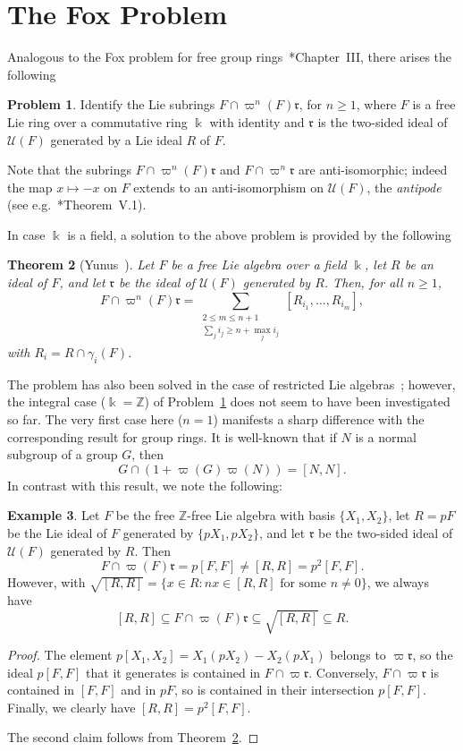 \documentclass[a4paper,reqno,notitlepage]{amsart}
\newtheorem{theorem}{Theorem}[section]
\theoremstyle{definition}
\newtheorem{problem}[theorem]{Problem}
\newtheorem{example}[theorem]{Example}
\newcommand{\Z}{\mathbb Z}
\newcommand\rr{{\mathfrak r}}
\newcommand\K{\Bbbk}
\newcommand\U{\mathscr U}
\begin{document}
\section{The Fox Problem}\label{ss:fox}
Analogous to the Fox problem for free group
rings~\cite{Gupta:87}*{Chapter~III}, there arises the following
\begin{problem}\label{fox}
  Identify the Lie subrings $F\cap\varpi^n(F)\rr$, for $n\geq
  1$, where $F$ is a free Lie ring over a commutative ring $\K$ with
  identity and $\rr$ is the two-sided ideal of $\U(F)$
  generated by a Lie ideal $R$ of $F$.
\end{problem}
Note that the subrings $F\cap\varpi^n(F)\rr$ and $F\cap\varpi^n\rr$
are anti-isomorphic; indeed the map $x\mapsto-x$ on $F$ extends to an
anti-isomorphism on $\U(F)$, the \emph{antipode} (see
e.g.~\cite{Jacobson:1962}*{Theorem~V.1}).

In case $\K$ is a field, a solution to the above problem is provided by
the following
\begin{theorem}[Yunus~\cite{Yunus:84}]\label{thm:yunus}
  Let $F$ be a free Lie algebra over a field $\K$, let $R$ be an ideal
  of $F$, and let $\rr$ be the ideal of $\U(F)$ generated by
  $R$. Then, for all $n\ge1$,
  \[F\cap \varpi^n(F)\rr=\sum_{\substack{2\leq m\leq n+1\\
      \sum_j i_j\geq n+\max_j i_j}} [R_{i_1},\ldots,R_{i_m}],
  \]
  with $R_i=R\cap \gamma_i(F)$.
\end{theorem}

The problem has also been solved in the case of restricted Lie
algebras~\cites{Usefi:2008,Usefi:2008a}; however, the integral case
($\K=\Z$) of Problem~\ref{fox} does not seem to have been investigated
so far. The very first case here ($n=1$) manifests a sharp difference
with the corresponding result for group rings. It is well-known that
if $N$ is a normal subgroup of a group $G$, then
\[G\cap (1+\varpi(G)\varpi(N))=[N,N].
\]
In contrast with this result, we note the following:

\begin{example}\label{example:fox}
  Let $F$ be the free $\Z$-free Lie algebra with basis $\{X_1,X_2\}$,
  let $R=pF$ be the Lie ideal of $F$ generated by $\{pX_1,pX_2\}$, and
  let $\rr$ be the two-sided ideal of $\U(F)$ generated by $R$. Then
  \[F\cap\varpi(F)\rr=p[F,F]\neq [R,R]=p^2[F,F].
  \]
  However, with $\sqrt{[R,R]}=\{x\in R\colon nx\in[R,R]\text{ for some
  }n\neq0\}$, we always have
  \[[R,R]\subseteq F\cap\varpi(F)\rr\subseteq\sqrt{[R,R]}\subseteq R.\]
\end{example}
\begin{proof}
  The element $p[X_1,X_2]=X_1(pX_2)-X_2(pX_1)$ belongs to $\varpi\rr$,
  so the ideal $p[F,F]$ that it generates is contained in
  $F\cap\varpi\rr$. Conversely, $F\cap\varpi\rr$ is contained in
  $[F,F]$ and in $pF$, so is contained in their intersection
  $p[F,F]$. Finally, we clearly have $[R,R]=p^2[F,F]$.

  The second claim follows from Theorem~\ref{thm:yunus}.
\end{proof}
\end{document}
